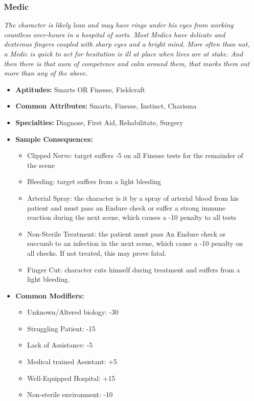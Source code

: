 \subsubsection{Medic}\label{Medic}
\textit{The character is likely lean and may have rings under his eyes from working countless over-hours in a hospital of sorts.
Most Medics have delicate and dexterous fingers coupled with sharp eyes and a bright mind.
More often than not, a Medic is quick to act for hesitation is ill at place when lives are at stake.
And then there is that aura of competence and calm around them, that marks them out more than any of the above.}
\begin{itemize}
	\item \textbf{Aptitudes:} Smarts OR Finesse, Fieldcraft
	\item \textbf{Common Attributes:} Smarts, Finesse, Instinct, Charisma
	\item \textbf{Specialties:} Diagnose, First Aid, Rehabilitate, Surgery
	\item \textbf{Sample Consequences:} 
	\begin{itemize}
		\item Clipped Nerve: target suffers -5 on all Finesse tests for the remainder of the scene
		\item Bleeding: target suffers from a light bleeding
		\item Arterial Spray: the character is it by a spray of arterial blood from his patient and must pass an Endure check or suffer a strong immune reaction during the next scene, which causes a -10 penalty to all tests
		\item Non-Sterile Treatment: the patient must pass An Endure check or succumb to an infection in the next scene, which cause a -10 penalty on all checks. If not treated, this may prove fatal.
		\item Finger Cut: character cuts himself during treatment and suffers from a light bleeding.
	\end{itemize}
	\item \textbf{Common Modifiers:}
	\begin{itemize}
		\item Unknown/Altered biology: -30
		\item Struggling Patient: -15
		\item Lack of Assistance: -5
		\item Medical trained Assistant: +5
		\item Well-Equipped Hospital: +15
		\item Non-sterile environment: -10
	\end{itemize}
\end{itemize}

